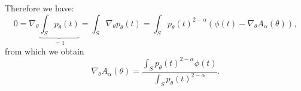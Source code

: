 \documentclass{article}
\begin{document}
Therefore we have:
\begin{equation}
0 = \nabla_\theta \underbrace{\int_S  p_\theta(t)}_{=1} = \int_S \nabla_\theta p_\theta(t) = \int_S p_\theta(t)^{2-\alpha} (\phi(t) - \nabla_\theta A_\alpha(\theta)),
\end{equation}
from which we obtain
\begin{equation}
    \nabla_\theta A_\alpha(\theta) = \frac{\int_S p_\theta(t)^{2-\alpha} \phi(t)}{\int_S p_\theta(t)^{2-\alpha}}.
\end{equation}

\begin{comment}
\begin{eqnarray}
\nabla_\theta A_{\alpha}(\theta) &=& \frac{\nabla_{\theta} \int_S p_\theta^{2-\alpha}(t) \theta^\top \phi(t) }{\int_S p_\theta^{2-\alpha}(t) }
-
 \frac{(A_\alpha(\theta) - (\alpha-1)^{-1})\nabla_\theta \int_S p_\theta^{2-\alpha}(t) }{\int_S p_\theta^{2-\alpha}(t)}\nonumber\\
 &=&
 \frac{\int_S (\nabla_{\theta}  p_\theta^{2-\alpha}(t)) \theta^\top \phi(t)  + \int_S  p_\theta^{2-\alpha}(t) \phi(t) }{\int_S p_\theta^{2-\alpha}(t) }
-
 \frac{(A_\alpha(\theta) - (\alpha-1)^{-1})  \int_S \nabla_\theta p_\theta^{2-\alpha}(t) }{\int_S p_\theta^{2-\alpha}(t) }\nonumber\\
 &=&
 \frac{\int_S  (\nabla_{\theta}  p_\theta^{2-\alpha}(t))(\theta^\top \phi(t) - A_\alpha(\theta) + (\alpha-1)^{-1})  + \int_S  p_\theta^{2-\alpha}(t) \phi(t) }{\int_S p_\theta^{2-\alpha}(t) }\nonumber\\
 &=&
 \frac{(\alpha-1)^{-1}\int_S p_\theta^{\alpha-1}(t) (\nabla_{\theta}  p_\theta^{2-\alpha}(t))  + \int_S  p_\theta^{2-\alpha}(t) \phi(t) }{\int_S p_\theta^{2-\alpha}(t) }\nonumber\\
&=&
 \frac{\int_S  p_\theta^{2-\alpha}(t) \phi(t) }{\int_S p_\theta^{2-\alpha}(t) }.
\end{eqnarray}
\end{comment}
\end{document}
